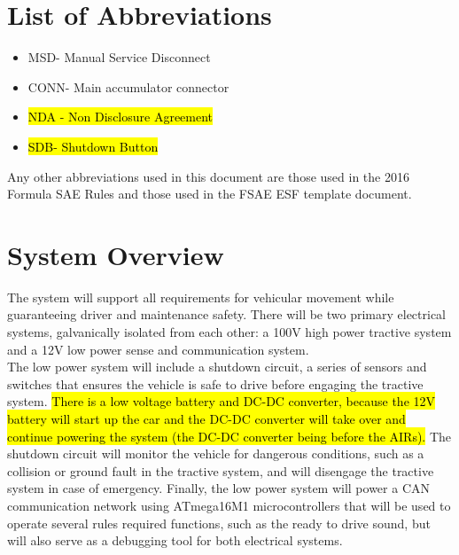 \documentclass{article}
\DeclareRobustCommand{\hlr}[1]{{\sethlcolor{red}\hl{#1}}}
\begin{document}
\tableofcontents
{}

\newpage
\listoffigures
{}

\newpage
\listoftables
{}

\newpage
\section*{List of Abbreviations}
\begin{itemize}
    \item MSD- Manual Service Disconnect
    \item CONN- Main accumulator connector
    \item \hlr{NDA - Non Disclosure Agreement}
    \item \hlr{SDB- Shutdown Button}
\end{itemize}


    Any other abbreviations used in this document are those used in the 2016 Formula SAE Rules and those used in the FSAE ESF template document.

\setlength{\parindent}{0pt}

\newpage
{}


\section{System Overview} %

    The system will support all requirements for vehicular movement while guaranteeing driver and maintenance safety. There will be two primary electrical systems, galvanically isolated from each other: a 100V high power tractive system and a 12V low power sense and communication system.\\

    The low power system will include a shutdown circuit, a series of sensors and switches that ensures the vehicle is safe to drive before engaging the tractive system. \hlr{There is a low voltage battery and DC-DC converter, because the 12V battery will start up the car and the DC-DC converter will take over and continue powering the system (the DC-DC converter being before the AIRs).} The shutdown circuit will monitor the vehicle for dangerous conditions, such as a collision or ground fault in the tractive system, and will disengage the tractive system in case of emergency. Finally, the low power system will power a CAN communication network using ATmega16M1 microcontrollers that will be used to operate several rules required functions, such as the ready to drive sound, but will also serve as a debugging tool for both electrical systems.\\
\end{document}
